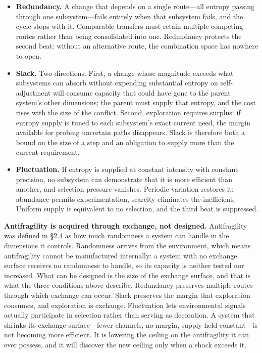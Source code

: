 \documentclass[11pt,a4paper]{article}
\begin{document}
\begin{itemize}
    \item \textbf{Redundancy.} A change that depends on a single route---all entropy passing through one subsystem---fails entirely when that subsystem fails, and the cycle stops with it. Comparable transfers must retain multiple competing routes rather than being consolidated into one. Redundancy protects the second beat: without an alternative route, the combination space has nowhere to open.
    \item \textbf{Slack.} Two directions. First, a change whose magnitude exceeds what subsystems can absorb without expending substantial entropy on self-adjustment will consume capacity that could have gone to the parent system's other dimensions; the parent must supply that entropy, and the cost rises with the size of the conflict. Second, exploration requires surplus: if entropy supply is tuned to each subsystem's exact current need, the margin available for probing uncertain paths disappears. Slack is therefore both a bound on the size of a step and an obligation to supply more than the current requirement.
    \item \textbf{Fluctuation.} If entropy is supplied at constant intensity with constant precision, no subsystem can demonstrate that it is more efficient than another, and selection pressure vanishes. Periodic variation restores it: abundance permits experimentation, scarcity eliminates the inefficient. Uniform supply is equivalent to no selection, and the third beat is suppressed.
\end{itemize}

\textbf{Antifragility is acquired through exchange, not designed.} Antifragility was defined in \S2.4 as how much randomness a system can handle in the dimensions it controls. Randomness arrives from the environment, which means antifragility cannot be manufactured internally: a system with no exchange surface receives no randomness to handle, so its capacity is neither tested nor increased. What can be designed is the size of the exchange surface, and that is what the three conditions above describe. Redundancy preserves multiple routes through which exchange can occur. Slack preserves the margin that exploration consumes, and exploration is exchange. Fluctuation lets environmental signals actually participate in selection rather than serving as decoration. A system that shrinks its exchange surface---fewer channels, no margin, supply held constant---is not becoming more efficient. It is lowering the ceiling on the antifragility it can ever possess, and it will discover the new ceiling only when a shock exceeds it.
\end{document}
